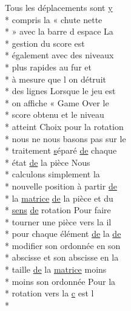 \begin{DoxyCompactItemize}
Tous les déplacements sont \hyperlink{gl_8h_a74d80fd479c0f6d0153c709949a089ef}{y} \\*
compris la « chute nette \\*
» avec la barre d espace La \\*
gestion du score est \\*
également avec des niveaux \\*
plus rapides au fur et \\*
à mesure que l on détruit \\*
des lignes Lorsque le jeu est \\*
on affiche « Game Over le \\*
score obtenu et le niveau \\*
atteint Choix pour la rotation \\*
nous ne nous basons pas sur le \\*
traitement \hyperlink{gl_8h_ad585a1393cfa368fa9dc3d8ebff640d5}{s}éparé \hyperlink{mainpage_8dox_ab37fa35e77d95c6d0d0ab620c97c3db8}{de} chaque \\*
état \hyperlink{mainpage_8dox_ab37fa35e77d95c6d0d0ab620c97c3db8}{de} la pièce Nous \\*
calculons simplement la \\*
nouvelle position à partir \hyperlink{mainpage_8dox_ab37fa35e77d95c6d0d0ab620c97c3db8}{de} \\*
la \hyperlink{mainpage_8dox_af2e36bcdda8980a3e5c1f4013331ee45}{matrice} \hyperlink{mainpage_8dox_ab37fa35e77d95c6d0d0ab620c97c3db8}{de} la pièce et du \\*
\hyperlink{mainpage_8dox_aa08a2c237abaf70493855740d9c5d0c8}{sens} \hyperlink{mainpage_8dox_ab37fa35e77d95c6d0d0ab620c97c3db8}{de} rotation Pour faire \\*
tourner une pièce vers la il \\*
pour chaque élément \hyperlink{mainpage_8dox_ab37fa35e77d95c6d0d0ab620c97c3db8}{de} la \hyperlink{mainpage_8dox_ab37fa35e77d95c6d0d0ab620c97c3db8}{de} \\*
modifier son ordonnée en son \\*
abscisse et son abscisse en la \\*
taille \hyperlink{mainpage_8dox_ab37fa35e77d95c6d0d0ab620c97c3db8}{de} la \hyperlink{mainpage_8dox_af2e36bcdda8980a3e5c1f4013331ee45}{matrice} moins \\*
moins son ordonnée Pour la \\*
rotation vers la \hyperlink{glext_8h_a1f2d7f8147412c43ba2303a56f97ee73}{c} est l \\*

\end{DoxyCompactItemize}
